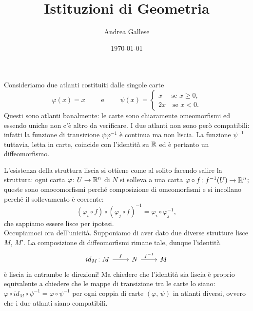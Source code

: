 \documentclass[a4paper]{article}
\title{Istituzioni di Geometria}\let\Title\@title
\author{Andrea Gallese}\let\Author\@author
\date{\today}\let\Date\@date
\begin{document}
	\Intitola

\begin{ex}[1.1]
	Consideriamo due atlanti costituiti dalle singole carte $$  \varphi(x) = x \qquad\text{ e }\qquad \psi(x) = \begin{cases}
	x \quad \text{ se } x \geq 0, \\
	2x \quad \text{se } x < 0.
	\end{cases}  $$
	Questi sono atlanti banalmente: le carte sono chiaramente omeomorfismi ed essendo uniche non c'è altro da verificare. I due atlanti non sono però compatibili: infatti la funzione di transizione $ \psi \varphi^{-1} $ è continua ma non liscia. La funzione $ \psi^{-1} $ tuttavia, letta in carte, coincide con l'identità su $ \mathbb{R} $ ed è pertanto un diffeomorfismo.
\end{ex}

\begin{ex}[1.2]
	L'esistenza della struttura liscia si ottiene come al solito facendo salire la struttura: ogni carta $ \varphi\colon U \to \mathbb{R}^n $ di $ N $ si solleva a una carta $ \varphi \circ f \colon f^{-1}(U) \to \mathbb{R}^n $; queste sono omoeomorfismi perché composizione di omeomorfismi e si incollano perché il sollevamento è coerente: $$  (\varphi_i \circ f) \circ (\varphi_j \circ f)^{-1} = \varphi_i \circ \varphi_j^{-1}, $$
	che sappiamo essere lisce per ipotesi. \\
	
	Occupiamoci ora dell'unicità. Supponiamo di aver dato due diverse strutture lisce $ M $, $ M' $. La composizione di diffeomorfismi rimane tale, dunque l'identità
	\[\begin{tikzcd}
	id_M \colon M \rar["f"] & N \rar["f^{-1}"] & M
	\end{tikzcd}  \]
	è liscia in entrambe le direzioni! Ma chiedere che l'identità sia liscia è proprio equivalente a chiedere che le mappe di transizione tra le carte lo siano: $ \varphi \circ id_M \circ \psi^{-1} = \varphi\circ\psi^{-1} $ per ogni coppia di carte $ (\varphi, \, \psi) $ in atlanti diversi, ovvero che i due atlanti siano compatibili.
\end{ex}
\end{document}
